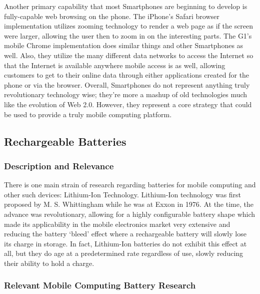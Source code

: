 \documentclass[12pt,oneside,letterpaper]{article}
\begin{document}
Another primary capability that most Smartphones are beginning to develop is
fully-capable web browsing on the phone.  The iPhone's Safari browser
implementation utilizes zooming technology to render a web page as if the screen
were larger, allowing the user then to zoom in on the interesting parts.  The
G1's mobile Chrome implementation does similar things and other Smartphones as
well.  Also, they utilize the many different data networks to access the
Internet so that the Internet is available anywhere mobile access is as well,
allowing customers to get to their online data through either applications
created for the phone or via the browser.  Overall, Smartphones do not represent
anything truly revolutionary technology wise; they're more a mashup of old
technologies much like the evolution of Web 2.0.  However, they represent a core
strategy that could be used to provide a truly mobile computing platform.

\subsection{Rechargeable Batteries}

\subsubsection{Description and Relevance}

There is one main strain of research regarding batteries for mobile computing
and other such devices: Lithium-Ion Technology.  Lithium-Ion technology was
first proposed by M. S. Whittingham while he was at Exxon in 1976.  At the time,
the advance was revolutionary, allowing for a highly configurable battery shape
which made its applicability in the mobile electronics market very extensive and
reducing the battery `bleed' effect where a rechargeable battery will slowly
lose its charge in storage.  In fact, Lithium-Ion batteries do not exhibit this
effect at all, but they do age at a predetermined rate regardless of use, slowly
reducing their ability to hold a charge.

\subsubsection{Relevant Mobile Computing Battery Research}
\end{document}

